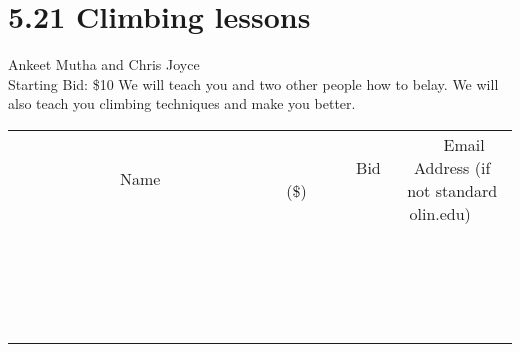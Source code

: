 \documentclass[11pt]{article}
\begin{document}
\section*{5.21 Climbing lessons}
Ankeet Mutha and Chris Joyce
\\
Starting Bid: \$10
\newline
We will teach you and two other people how to belay. We will also teach you climbing techniques and make you better.
\\[3ex]
\begin{tabular}{c c c}
~~~~~~~~~~~~~Name~~~~~~~~~~~~~ & ~~~~~~~~~Bid (\$)~~~~~~~~~  & ~~~Email Address (if not standard olin.edu)~~~\\
 & & \\
\hline
 & & \\
\hline
 & & \\
\hline
 & & \\
\hline
 & & \\
\hline
 & & \\
\hline
 & & \\
\hline
 & & \\
\hline
 & & \\
\hline
 & & \\
\hline
 & & \\
\hline
 & & \\
\hline
 & & \\
\hline
 & & \\
\hline
 & & \\
\hline
 & & \\
\hline
 & & \\
\hline
 & & \\
\hline
 & & \\
\hline
\end{tabular}
\newpage
\end{document}
